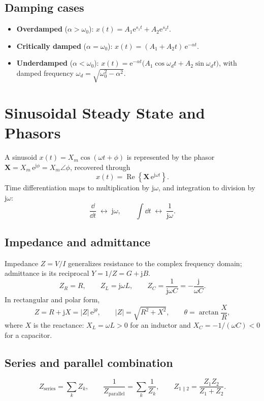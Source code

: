 \documentclass{essay}
\newcommand{\ee}{\mathrm{e}}
\newcommand{\jj}{\mathrm{j}}
\renewcommand{\Re}{\operatorname{Re}}
\begin{document}
\subsection{Damping cases}
\begin{itemize}
  \item \textbf{Overdamped} (\(\alpha > \omega_{0}\)):
    \(x(t) = A_{1}\ee^{s_{1} t} + A_{2}\ee^{s_{2} t}\).
  \item \textbf{Critically damped} (\(\alpha = \omega_{0}\)):
    \(x(t) = (A_{1} + A_{2} t)\,\ee^{-\alpha t}\).
  \item \textbf{Underdamped} (\(\alpha < \omega_{0}\)):
    \(x(t) = \ee^{-\alpha t}\bigl(A_{1}\cos\omega_{d} t + A_{2}\sin\omega_{d} t\bigr)\),
    with damped frequency \(\omega_{d} = \sqrt{\omega_{0}^{2} - \alpha^{2}}\).
\end{itemize}

\section{Sinusoidal Steady State and Phasors}

A sinusoid \(x(t) = X_{m}\cos(\omega t + \phi)\) is represented by the phasor
\(\mathbf{X} = X_{m}\,\ee^{\jj\phi} = X_{m}\angle\phi\), recovered through
\[ x(t) = \Re\!\left\{\mathbf{X}\,\ee^{\jj\omega t}\right\}. \]
Time differentiation maps to multiplication by \(\jj\omega\), and integration to
division by \(\jj\omega\):
\[ \frac{\dd}{\dd t} \;\longleftrightarrow\; \jj\omega, \qquad \int \dd t \;\longleftrightarrow\; \frac{1}{\jj\omega}. \]

\subsection{Impedance and admittance}
Impedance \(Z = V/I\) generalizes resistance to the complex frequency domain;
admittance is its reciprocal \(Y = 1/Z = G + \jj B\).
\[ Z_{R} = R, \qquad Z_{L} = \jj\omega L, \qquad Z_{C} = \frac{1}{\jj\omega C} = -\frac{\jj}{\omega C}. \]
In rectangular and polar form,
\[ Z = R + \jj X = |Z|\,\ee^{\jj\theta}, \qquad |Z| = \sqrt{R^{2} + X^{2}}, \qquad \theta = \arctan\!\frac{X}{R}, \]
where \(X\) is the reactance: \(X_{L} = \omega L > 0\) for an inductor and
\(X_{C} = -1/(\omega C) < 0\) for a capacitor.

\subsection{Series and parallel combination}
\[ Z_{\text{series}} = \sum_{k} Z_{k}, \qquad \frac{1}{Z_{\text{parallel}}} = \sum_{k} \frac{1}{Z_{k}}, \qquad Z_{1\parallel 2} = \frac{Z_{1} Z_{2}}{Z_{1} + Z_{2}}. \]
\end{document}
